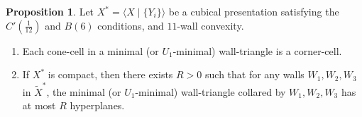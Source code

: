 \documentclass[12pt,oneside]{amsart}
\theoremstyle{definition}
\newtheorem{prop}[thm]{Proposition}
\theoremstyle{definition}
\theoremstyle{remark}
\begin{document}
\begin{prop}\label{prop: uniformly thin wall triangles}
Let $X^*=\langle X \mid \{Y_i\} \rangle $ be a 
 cubical presentation satisfying the $C'(\frac{1}{12})$ and
 $B(6)$ conditions, and $11$-wall convexity.
 \begin{enumerate}
     \item\label{part: wall-triangles} Each cone-cell in a minimal (or $U_1$-minimal) wall-triangle is a corner-cell.
     \item\label{part: bounded} 
     If $X^*$ is compact, then there exists $R>0$ such that for any walls $W_1, W_2, W_3$ in $\widetilde X^*$, the minimal (or $U_1$-minimal) wall-triangle collared by $W_1, W_2, W_3$ has at most $R$ hyperplanes.

 \end{enumerate}
\end{prop}
\end{document}
